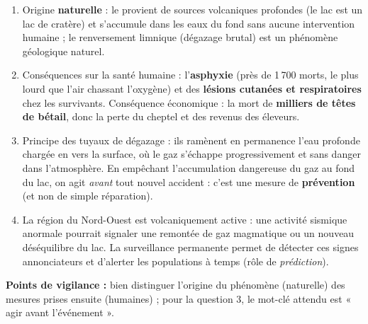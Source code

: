 \documentclass[11pt]{article}
\begin{document}
\begin{corrige}
\begin{enumerate}
\item Origine \textbf{naturelle} : le  provient de sources volcaniques profondes (le lac est un lac de cratère) et s'accumule dans les eaux du fond sans aucune intervention humaine ; le renversement limnique (dégazage brutal) est un phénomène géologique naturel.
\item Conséquences sur la santé humaine : l'\textbf{asphyxie} (près de 1\,700 morts, le  plus lourd que l'air chassant l'oxygène) et des \textbf{lésions cutanées et respiratoires} chez les survivants. Conséquence économique : la mort de \textbf{milliers de têtes de bétail}, donc la perte du cheptel et des revenus des éleveurs.
\item Principe des tuyaux de dégazage : ils ramènent en permanence l'eau profonde chargée en  vers la surface, où le gaz s'échappe progressivement et sans danger dans l'atmosphère. En empêchant l'accumulation dangereuse du gaz au fond du lac, on agit \emph{avant} tout nouvel accident : c'est une mesure de \textbf{prévention} (et non de simple réparation).
\item La région du Nord-Ouest est volcaniquement active : une activité sismique anormale pourrait signaler une remontée de gaz magmatique ou un nouveau déséquilibre du lac. La surveillance permanente permet de détecter ces signes annonciateurs et d'alerter les populations à temps (rôle de \emph{prédiction}).
\end{enumerate}
\textbf{Points de vigilance :} bien distinguer l'origine du phénomène (naturelle) des mesures prises ensuite (humaines) ; pour la question 3, le mot-clé attendu est « agir avant l'événement ».
\end{corrige}
\end{document}
